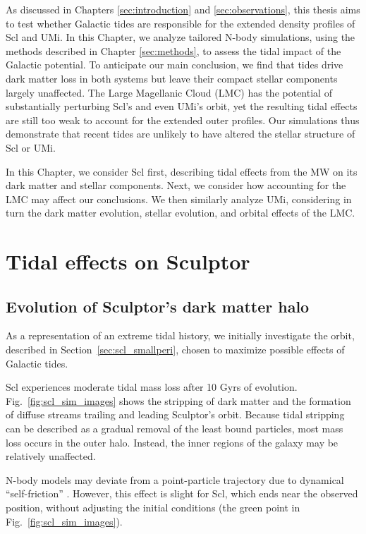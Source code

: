 As discussed in Chapters \ref{sec:introduction} and
\ref{sec:observations}, this thesis aims to test whether Galactic tides
are responsible for the extended density profiles of Scl and UMi. In
this Chapter, we analyze tailored N-body simulations, using the methods
described in Chapter \ref{sec:methods}, to assess the tidal impact of
the Galactic potential. To anticipate our main conclusion, we find that
tides drive dark matter loss in both systems but leave their compact
stellar components largely unaffected. The Large Magellanic Cloud (LMC)
has the potential of substantially perturbing Scl's and even UMi's
orbit, yet the resulting tidal effects are still too weak to account for
the extended outer profiles. Our simulations thus demonstrate that
recent tides are unlikely to have altered the stellar structure of Scl
or UMi.

In this Chapter, we consider Scl first, describing tidal effects from
the MW on its dark matter and stellar components. Next, we consider how
accounting for the LMC may affect our conclusions. We then similarly
analyze UMi, considering in turn the dark matter evolution, stellar
evolution, and orbital effects of the LMC.

\section{Tidal effects on Sculptor}\label{tidal-effects-on-sculptor}

\subsection{Evolution of Sculptor's dark matter
halo}\label{evolution-of-sculptors-dark-matter-halo}

As a representation of an extreme tidal history, we initially
investigate the \smallperi{} orbit, described in
Section~\ref{sec:scl_smallperi}, chosen to maximize possible effects of
Galactic tides.

Scl experiences moderate tidal mass loss after 10 Gyrs of evolution.
Fig.~\ref{fig:scl_sim_images} shows the stripping of dark matter and the
formation of diffuse streams trailing and leading Sculptor's orbit.
Because tidal stripping can be described as a gradual removal of the
least bound particles, most mass loss occurs in the outer halo. Instead,
the inner regions of the galaxy may be relatively unaffected.

N-body models may deviate from a point-particle trajectory due to
dynamical ``self-friction'' \citep[e.g.,][]{white1983, miller+2020}.
However, this effect is slight for Scl, which ends near the observed
position, without adjusting the initial conditions (the green point in
Fig.~\ref{fig:scl_sim_images}).

